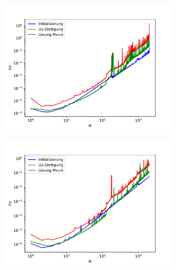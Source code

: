 \documentclass{scrartcl}
\begin{document}
		\begin{figure}[h!]
		\centering
		\begin{subfigure}{0.8\textwidth}
		\includegraphics[width=\textwidth]{A2/build/timers_lin.pdf}
		\end{subfigure}
		\begin{subfigure}{0.4\textwidth}
		\includegraphics[width=\textwidth]{A2/Dann_halt_so/timers_lin_PC.pdf}
		\end{subfigure}
		\begin{subfigure}{0.4\textwidth}

\end{subfigure}
\end{figure}
\end{document}
